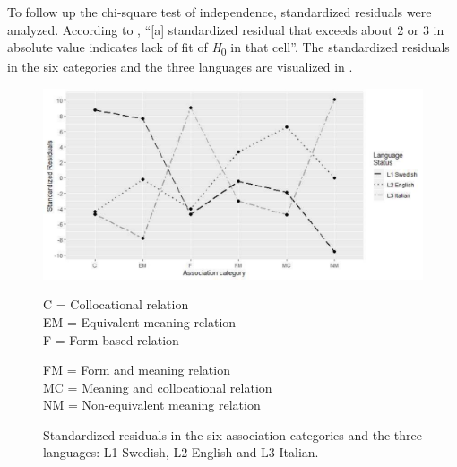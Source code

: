 \documentclass[output=paper,colorlinks,citecolor=brown,nonflat]{langsci/langscibook}
\begin{document}
To follow up the chi-square test of independence, standardized residuals were analyzed. According to \citet[81]{Agresti2013}, “[a] standardized residual that exceeds about 2 or 3 in absolute value indicates lack of fit of \textit{H}\textsubscript{0} in that cell”. The standardized residuals in the six categories and the three languages are visualized in .

\begin{figure}
    \includegraphics[width=\textwidth]{figures/Gudmundson-fig3.pdf}
    \caption{Standardized residuals in the six association categories and the three languages: L1 Swedish, L2 English and L3 Italian.}
    \parbox{.5\textwidth}{
    \footnotesize
    C = Collocational relation\\
    EM = Equivalent meaning relation\\
    F = Form-based relation
    }\parbox{.5\textwidth}{
    \footnotesize
    FM = Form and meaning relation\\
    MC = Meaning and collocational relation\\
    NM = Non-equivalent meaning relation\\
    }
    \label{fig:gudmundson:3}
\end{figure}
\end{document}
